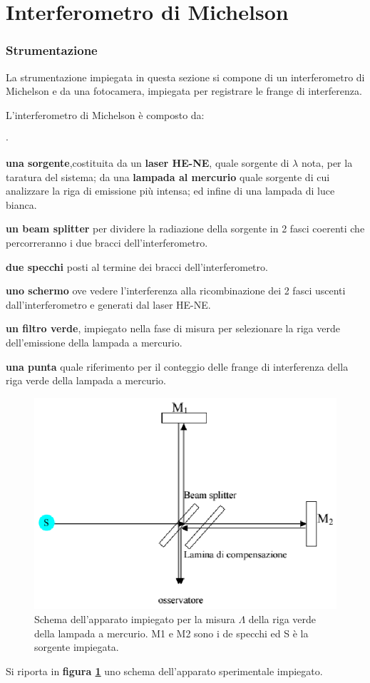 \part{Interferometro di Michelson }

\section{Strumentazione}
La strumentazione impiegata in questa sezione  si 
compone di un interferometro di Michelson e da una fotocamera,
impiegata per registrare le frange di interferenza.

L'interferometro di Michelson è composto da:
\begin{list}{$\cdot$}{}
\item \textbf{una sorgente},costituita da un \textbf{laser HE-NE}, 
quale sorgente di $\lambda$ nota,
per la taratura del sistema; da una \textbf{lampada al mercurio} quale 
sorgente di cui analizzare la riga di emissione più intensa; ed infine di una lampada
di luce bianca.
\item \textbf{un beam splitter} per dividere la radiazione della sorgente
in 2 fasci coerenti che percorreranno i
due bracci dell'interferometro.
\item \textbf{due specchi} posti al termine dei bracci 
dell'interferometro. 
\item \textbf{uno schermo} ove vedere l'interferenza alla ricombinazione dei 2 
fasci uscenti dall'interferometro e generati dal laser HE-NE.
\item \textbf{un filtro verde}, impiegato nella fase di misura per selezionare 
la riga verde 
dell'emissione della lampada a mercurio.
\item \textbf{una punta} quale riferimento per il conteggio delle frange di interferenza 
della riga verde della lampada a mercurio.
\end{list}
\bigskip


\begin{figure} [!h]
	\centering
	\includegraphics[scale=0.5]{./pictures/immagine2}
	\caption{Schema dell'apparato impiegato per la misura $\Lambda$ della riga verde della lampada a mercurio.
	M1 e M2 sono i de specchi ed S è la sorgente impiegata.}
	\label{fig:schema_appar2}
\end{figure}
Si riporta in \textbf{figura \ref{fig:schema_appar2} }uno schema dell'apparato sperimentale impiegato. 